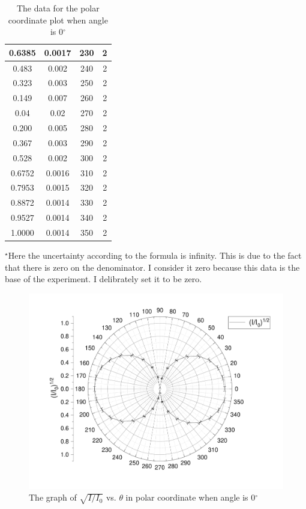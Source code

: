 \documentclass{my_template}
\begin{document}
\begin{table}[!ht]
\begin{tabular}{|c|c|c|c|}
            0.6385&0.0017&230&2\\\hline
            0.483&0.002&240&2\\\hline
            0.323&0.003&250&2\\\hline
            0.149&0.007&260&2\\\hline
            0.04&0.02&270&2\\\hline
            0.200&0.005&280&2\\\hline
            0.367&0.003&290&2\\\hline
            0.528&0.002&300&2\\\hline
            0.6752&0.0016&310&2\\\hline
            0.7953&0.0015&320&2\\\hline
            0.8872&0.0014&330&2\\\hline
            0.9527&0.0014&340&2\\\hline
            1.0000&0.0014&350&2\\\hline
        \end{tabular}
        \caption{The data for the polar coordinate plot when angle is 0$^\circ$}
        \label{tab:plot0}
        $^\star$Here the uncertainty according to the formula is infinity. This is due to the fact that there is zero on the denominator. I consider it zero because this data is the base of the experiment. I delibrately set it to be zero.
    \end{table}
    \begin{figure}[!ht]
        \centering
        \includegraphics[width=\textwidth]{fig/quarter0.pdf}
        \caption{The graph of $\sqrt{I/I_0}$ vs. $\theta$ in polar coordinate when angle is 0$^\circ$}
        \label{fig:quarter0}
    \end{figure}
\end{document}
